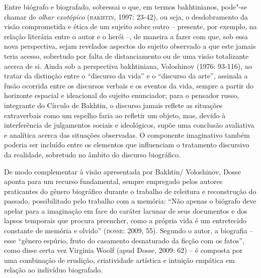 \documentclass[12pt]{extarticle}
\begin{document}
Entre biógrafo e biografado, sobressai o que, em termos bakhtinianos,
pode"-se chamar de \emph{olhar exotópico} (\textsc{bakhtin}, 1997: 23-42), ou
seja, o desdobramento da visão comprometida e ética de um sujeito sobre
outro -- presente, por exemplo, na relação literária entre o autor e o
herói --, de maneira a fazer com que, sob essa nova perspectiva, sejam
revelados aspectos do sujeito observado a que este jamais teria acesso,
sobretudo por falta de distanciamento ou de uma visão totalizante acerca
de si. Ainda sob a perspectiva bakhtiniana, Voloshinov (1976: 93-116),
ao tratar da distinção entre o ``discurso da vida'' e o ``discurso da
arte'', assinala a fusão ocorrida entre os discursos verbais e os eventos
da vida, sempre a partir do horizonte espacial e ideacional do sujeito
enunciador; para o pensador russo, integrante do Círculo de Bakhtin, o
discurso jamais reflete as situações extraverbais como um espelho faria
ao refletir um objeto, mas, devido à interferência de julgamentos
sociais e ideológicos, supõe uma conclusão avaliativa e analítica acerca
das situações observadas. O componente imaginativo também poderia ser
incluído entre os elementos que influenciam o tratamento discursivo da
realidade, sobretudo no âmbito do discurso biográfico.

De modo complementar à visão apresentada por Bakhtin/ Voloshinov, Dosse
aponta para um recurso fundamental, sempre empregado pelos autores
praticantes do gênero biográfico durante o trabalho de releitura e
reconstrução do passado, possibilitado pelo trabalho com a memória: ``Não
apenas o biógrafo deve apelar para a imaginação em face do caráter
lacunar de seus documentos e dos lapsos temporais que procura preencher,
como a própria vida é um entretecido constante de memória e olvido''
(\textsc{dosse}: 2009, 55). Segundo o autor, a biografia -- esse ``gênero espúrio,
fruto do casamento desnaturado da ficção com os fatos'', como disse certa
vez Virginia Woolf (apud Dosse, 2009: 62) -- é composta por uma
combinação de erudição, criatividade artística e intuição empática em
relação ao indivíduo biografado.
\end{document}
